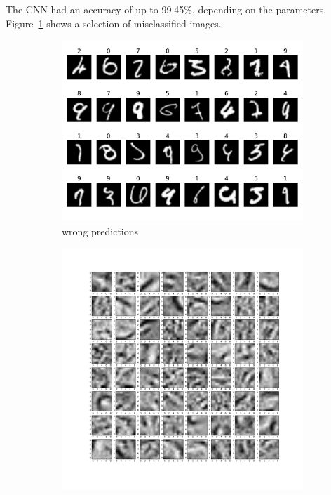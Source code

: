 \documentclass{article}
\begin{document}
\begin{enumerate}
	\begin{item}
		The CNN had an accuracy of up to 99.45\%, depending on the parameters. Figure~\ref{fig:wrong_preds} shows a selection of misclassified images. 
		\begin{figure}
			\centering	
			\begin{subfigure}[b]{0.45\textwidth}
				\includegraphics[width=\textwidth]{figures/wrong_predictions}
				\caption{wrong predictions}
				\label{fig:wrong_preds}
			\end{subfigure}	
			\begin{subfigure}[b]{0.45\textwidth}
				\includegraphics[width=\textwidth]{figures/99_43}

\end{subfigure}
\end{figure}
\end{item}
\end{enumerate}
\end{document}
